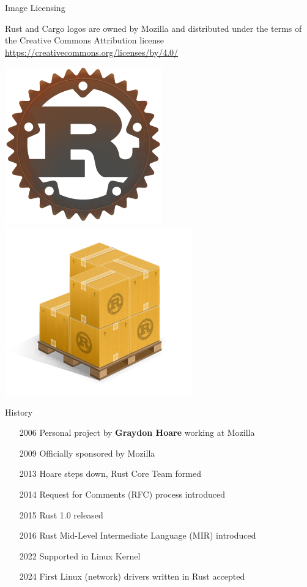 \documentclass{beamer}
\begin{document}
\begin{frame}{Image Licensing} 

Rust and Cargo logos are owned by Mozilla and distributed under the terms of the Creative Commons Attribution license  \url{https://creativecommons.org/licenses/by/4.0/}
\begin{center}
\includegraphics[scale=0.4]{rust-logo-256x256}
\includegraphics[scale=0.4]{Cargo-Logo-Small}
\end{center}
\end{frame} 




\begin{frame}{History}
    \begin{itemize}
        \item[2006] Personal project by \textbf{Graydon Hoare} working at Mozilla
        \item[2009] Officially sponsored by Mozilla
        \item[2013] Hoare steps down, Rust Core Team formed
        \item[2014] Request for Comments (RFC) process introduced
        \item[2015] Rust 1.0 released
        \item[2016] Rust Mid-Level Intermediate Language (MIR) introduced
        \item[2022] Supported in Linux Kernel
        \item[2024] First Linux (network) drivers written in Rust accepted
	\end{itemize}
\end{frame}
\end{document}
